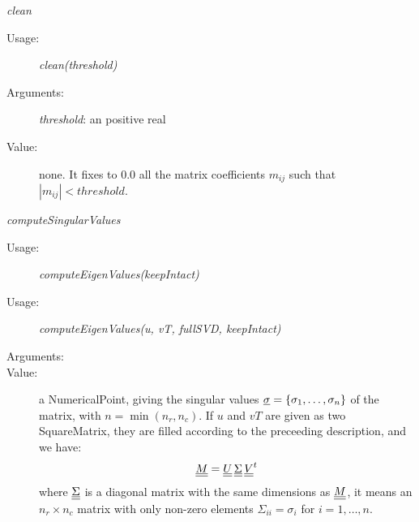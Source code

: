 \begin{description}
\begin{description}
\item \textit{clean}
\begin{description}
\item[Usage:] \textit{clean(threshold)}
\item[Arguments:] \textit{threshold}: an positive real
\item[Value:] none. It fixes to 0.0 all the matrix coefficients $m_{ij}$ such that $|m_{ij}| < threshold$.
\end{description}
\bigskip

\item \textit{computeSingularValues}
\begin{description}
\item[Usage:] \textit{computeEigenValues(keepIntact)}
\item[Usage:] \textit{computeEigenValues(u, vT, fullSVD, keepIntact)}
\item[Arguments:]  \rule{0pt}{1em}
\item[Value:] a NumericalPoint, giving the singular values ${\underline{\sigma}}=\{\sigma_1,\hdots,\sigma_{n}\}$ of the matrix, with $n=\min(n_r, n_c)$. If $u$ and $vT$ are given as two SquareMatrix, they are filled according to the preceeding description, and we have:
\begin{equation*}
{\underline{\underline{M}}} = {\underline{\underline{U}}}\,{\underline{\underline{\Sigma}}}\,{{{\underline{\underline{V}}}}^t}
\end{equation*}
where ${\underline{\underline{\Sigma}}}$ is a diagonal matrix with the same dimensions as ${\underline{\underline{M}}}$, it means an $n_r\times n_c$ matrix with only non-zero elements $\Sigma_{ii}=\sigma_i$ for $i=1,\hdots,n$.
\end{description}
\bigskip


\end{description}
\end{description}
